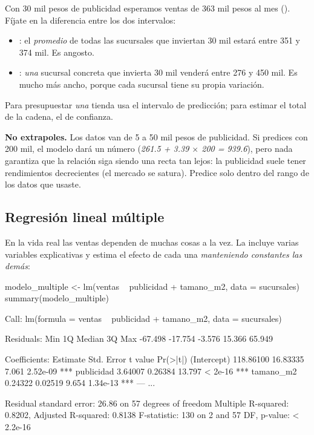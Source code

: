Con 30 mil pesos de publicidad esperamos ventas de 363 mil pesos al mes
(). Fíjate en la diferencia entre los dos intervalos:
\begin{itemize}
  \item {}: el \emph{promedio} de todas las sucursales que
        inviertan 30 mil estará entre 351 y 374 mil. Es angosto.
  \item {}: \emph{una} sucursal concreta que invierta 30 mil
        venderá entre 276 y 450 mil. Es mucho más ancho, porque cada
        sucursal tiene su propia variación.
\end{itemize}
Para presupuestar \emph{una} tienda usa el intervalo de predicción; para
estimar el total de la cadena, el de confianza.

\begin{advertencia}
\textbf{No extrapoles.} Los datos van de 5 a 50 mil pesos de publicidad. Si
predices con 200 mil, el modelo dará un número (\emph{261.5 + 3.39 $\times$
200 = 939.6}), pero nada garantiza que la relación siga siendo una recta tan
lejos: la publicidad suele tener rendimientos decrecientes (el mercado se
satura). Predice solo dentro del rango de los datos que usaste.
\end{advertencia}

\subsection{Regresión lineal múltiple}

En la vida real las ventas dependen de muchas cosas a la vez. La
 incluye varias variables explicativas y estima
el efecto de cada una \emph{manteniendo constantes las demás}:

\begin{rcode}
modelo_multiple <- lm(ventas ~ publicidad + tamano_m2, data = sucursales)
summary(modelo_multiple)
\end{rcode}
\begin{rsalida}
Call:
lm(formula = ventas ~ publicidad + tamano_m2, data = sucursales)

Residuals:
    Min      1Q  Median      3Q     Max
-67.498 -17.754  -3.576  15.366  65.949

Coefficients:
             Estimate Std. Error t value Pr(>|t|)
(Intercept) 118.86100   16.83335   7.061 2.52e-09 ***
publicidad    3.64007    0.26384  13.797  < 2e-16 ***
tamano_m2     0.24322    0.02519   9.654 1.34e-13 ***
---
...

Residual standard error: 26.86 on 57 degrees of freedom
Multiple R-squared:  0.8202,    Adjusted R-squared:  0.8138
F-statistic:   130 on 2 and 57 DF,  p-value: < 2.2e-16
\end{rsalida}

